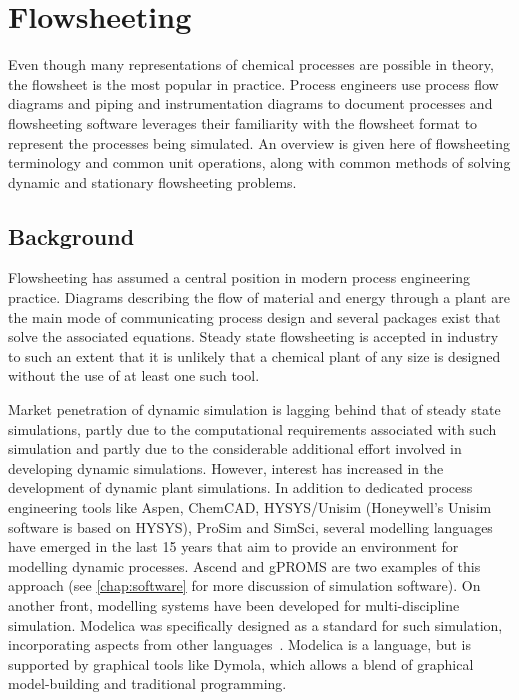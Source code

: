 \chapter{Flowsheeting}

\begin{overview}
  Even though many representations of chemical processes are possible
  in theory, the flowsheet is the most popular in practice.  Process
  engineers use process flow diagrams and piping and instrumentation
  diagrams to document processes and flowsheeting software leverages
  their familiarity with the flowsheet format to represent the
  processes being simulated.  An overview is given here of
  flowsheeting terminology and common unit operations, along with
  common methods of solving dynamic and stationary flowsheeting
  problems.
\end{overview}

\section{Background}
Flowsheeting has assumed a central position in modern process engineering
practice.  Diagrams describing the flow of material and energy through a plant are the main mode of communicating process
design and several packages exist that solve the associated equations.
Steady state flowsheeting is accepted in industry to such an extent
that it is unlikely that a chemical plant of any size is designed
without the use of at least one such tool.~\citep{glasscock_simulation}

Market penetration of dynamic simulation is lagging behind that of
steady state simulations, partly due to the computational requirements
associated with such simulation and partly due to the considerable
additional effort involved in developing dynamic simulations.
However, interest has increased in the development of dynamic plant
simulations.  In addition to dedicated process engineering tools like
Aspen, ChemCAD, HYSYS/Unisim (Honeywell's Unisim software is
  based on HYSYS), ProSim and SimSci, several modelling languages have
emerged in the last 15 years that aim to provide an environment for
modelling dynamic processes.  Ascend and gPROMS are two examples of
this approach (see \ref{chap:software} for more discussion of simulation
software). On another front, modelling systems have been developed for
multi-discipline simulation.  Modelica was specifically designed as a standard
for such simulation, incorporating aspects from other languages~\citep{elmqvist97,tillerbook}.  Modelica is a language,
but is supported by graphical tools like Dymola, which allows a blend
of graphical model-building and traditional programming.

